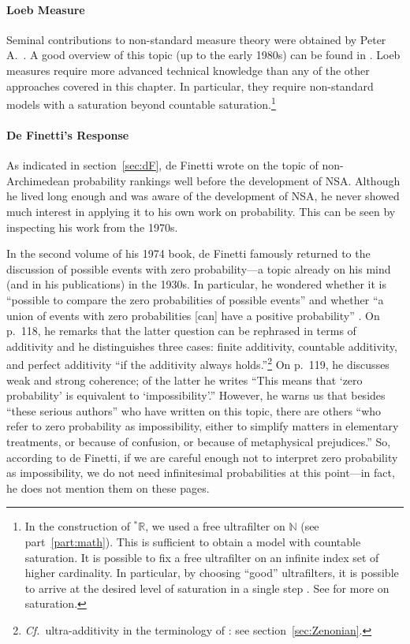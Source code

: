 \paragraph{Loeb Measure}
Seminal contributions to non-standard measure theory were obtained by Peter A.~\citet{Loeb:1975}. A good overview of this topic (up to the early 1980s) can be found in \citet{Cutland:1983}. Loeb measures require more advanced technical knowledge than any of the other approaches covered in this chapter. In particular, they require non-standard models with a saturation beyond countable saturation.\footnote{In the construction of ${^\ast\mathbb{R}}$, we used a free ultrafilter on $\mathbb{N}$ (see part~\ref{part:math}). This is sufficient to obtain a model with countable saturation. It is possible to fix a free ultrafilter on an infinite index set of higher cardinality. In particular, by choosing ``good'' ultrafilters, it is possible to arrive at the desired level of saturation in a single step \citep[section~10]{Keisler:2010}. See \citet[pp.~104--108]{HurdLoeb:1985} for more on saturation.}

\paragraph{De Finetti's Response\label{sec:dF2}}
As indicated in section~\ref{sec:dF}, de Finetti wrote on the topic of non-Archimedean probability rankings well before the development of NSA. Although he lived long enough and was aware of the development of NSA, he never showed much interest in applying it to his own work on probability. This can be seen by inspecting his work from the 1970s.

In the second volume of his 1974 book, de Finetti famously returned to the discussion of possible events with zero probability---a topic already on his mind (and in his publications) in the 1930s.
In particular, he wondered whether it is ``possible to compare the zero probabilities of possible events'' and whether ``a union of events with zero probabilities [can] have a positive probability'' \citep[Vol.~II, p.~117]{deFinetti:1974}.
On p.~118, he remarks that the latter question can be rephrased in terms of additivity and he distinguishes three cases: finite additivity, countable additivity, and perfect additivity ``if the additivity always holds.''\footnote{\textit{Cf.}\ ultra-additivity in the terminology of \citet{Skyrms:1983a}: see section~\ref{sec:Zenonian}.}
On p.~119, he discusses weak and strong coherence; of the latter he writes ``This means that `zero probability' is equivalent to `impossibility'.'' However, he warns us that besides ``these serious authors'' who have written on this topic, there are others ``who refer to zero probability as impossibility, either to simplify matters in elementary treatments, or because of confusion, or because of metaphysical prejudices.''
So, according to de Finetti, if we are careful enough not to interpret zero probability as impossibility, we do not need infinitesimal probabilities at this point---in fact, he does not mention them on these pages.

